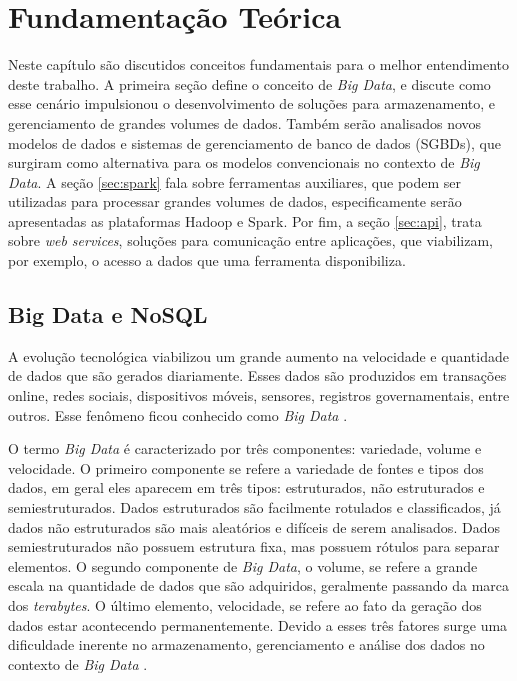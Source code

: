 
\chapter{Fundamentação Teórica}
\label{chap:fundamentacaoTeorica}

Neste capítulo são discutidos conceitos fundamentais para o melhor entendimento deste 
trabalho. A primeira seção define o conceito de \textit{Big Data}, e discute como esse 
cenário impulsionou o desenvolvimento de soluções para armazenamento, e gerenciamento de 
grandes volumes de dados. Também serão analisados novos modelos de dados e sistemas de 
gerenciamento de banco de dados (SGBDs), que surgiram como alternativa para os modelos 
convencionais no contexto de \textit{Big Data}. A seção \ref{sec:spark} fala 
sobre ferramentas auxiliares, que podem ser utilizadas para processar grandes volumes de dados,
especificamente serão apresentadas as plataformas Hadoop e Spark. Por fim, a seção 
\ref{sec:api}, trata sobre \textit{web services}, soluções para comunicação entre aplicações, 
que viabilizam, por exemplo, o acesso a dados que uma ferramenta disponibiliza.

\section{Big Data e NoSQL}
\label{sec:bigdata}

A evolução tecnológica viabilizou um grande aumento na velocidade e quantidade de dados que 
são gerados diariamente. Esses dados são produzidos em transações online, redes sociais, 
dispositivos móveis, sensores, registros governamentais, entre outros. Esse fenômeno ficou 
conhecido como \textit{Big Data} \cite{sagiroglu2013big}. 

O termo \textit{Big Data} é caracterizado por três componentes: variedade, volume e velocidade. 
O primeiro componente se refere a variedade de fontes e tipos dos dados, em geral eles 
aparecem em três tipos: estruturados, não estruturados e semiestruturados. Dados estruturados 
são facilmente rotulados e classificados, já dados não estruturados são mais aleatórios e 
difíceis de serem analisados. Dados semiestruturados não possuem estrutura fixa, mas possuem 
rótulos para separar elementos. O segundo componente de \textit{Big Data}, o volume, se 
refere a grande escala na quantidade de dados que são adquiridos, geralmente passando da 
marca dos \textit{terabytes}. O último elemento, velocidade, se refere ao fato da geração 
dos dados estar acontecendo permanentemente. Devido a esses três fatores surge uma 
dificuldade inerente no armazenamento, gerenciamento e análise dos dados no contexto de 
\textit{Big Data} \cite{sagiroglu2013big}.

